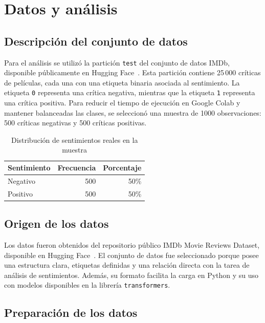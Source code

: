 \documentclass[11pt,letterpaper]{article}
\begin{document}
	\section{Datos y análisis}
	
	\subsection{Descripción del conjunto de datos}
	
	Para el análisis se utilizó la partición \texttt{test} del conjunto de datos IMDb, disponible públicamente en Hugging Face~\cite{imdbdataset}. Esta partición contiene 25\,000 críticas de películas, cada una con una etiqueta binaria asociada al sentimiento. La etiqueta \texttt{0} representa una crítica negativa, mientras que la etiqueta \texttt{1} representa una crítica positiva. Para reducir el tiempo de ejecución en Google Colab y mantener balanceadas las clases, se seleccionó una muestra de 1000 observaciones: 500 críticas negativas y 500 críticas positivas.
	
	\begin{table}[H]
		\centering
		\caption{Distribución de sentimientos reales en la muestra}
		\label{tab:distribucion-sentimientos}
		\begin{tabular}{lrr}
			\toprule
			Sentimiento & Frecuencia & Porcentaje \\
			\midrule
			Negativo & 500 & 50\% \\
			Positivo & 500 & 50\% \\
			\bottomrule
		\end{tabular}
	\end{table}
	\subsection{Origen de los datos}
	
	Los datos fueron obtenidos del repositorio público IMDb Movie Reviews Dataset, disponible en Hugging Face~\cite{imdbdataset}. El conjunto de datos fue seleccionado porque posee una estructura clara, etiquetas definidas y una relación directa con la tarea de análisis de sentimientos. Además, su formato facilita la carga en Python y su uso con modelos disponibles en la librería \texttt{transformers}.
	
	\subsection{Preparación de los datos}
	
\end{document}
